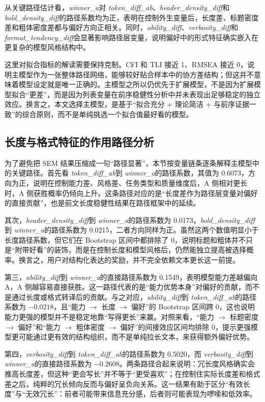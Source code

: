 \documentclass[9pt,a4paper,fontset=windows]{ctexart}
\theoremstyle{definition}
\numberwithin{equation}{section}
\newcommand{\winner}{\textit{winner\_a}}
\newcommand{\tokendiff}{\textit{token\_diff\_ab}}
\newcommand{\headerD}{\textit{header\_density\_diff}}
\newcommand{\boldD}{\textit{bold\_density\_diff}}
\newcommand{\ability}{\textit{ability\_diff}}
\newcommand{\verbosity}{\textit{verbosity\_diff}}
\newcommand{\formatt}{\textit{format\_tendency\_diff}}
\begin{document}
从关键路径估计看，\winner 对 \tokendiff、\headerD 和 \boldD 的路径系数均为正，表明在控制外生变量后，长度差、标题密度差和粗体密度差都与偏好方向正相关。同时，\ability、\verbosity 和 \formatt 会显著影响路径层变量，说明偏好中的形式特征确实嵌入在更复杂的模型风格结构中。

这里对拟合指标的解读需要保持克制。CFI 和 TLI 接近 1、RMSEA 接近 0，说明主模型作为一张整体路径网络，能够较好贴合样本中的协方差结构；但这并不意味着模型设定就是唯一正确的。主模型之所以仍优先于扩展模型，不是因为扩展模型拟合“更差”，而是因为列表变量在前序稳健性分析中并未表现出足够稳定的独立效应。换言之，本文选择主模型，是基于“拟合充分 \(+\) 理论简洁 \(+\) 与前序证据一致”的综合原则，而不是单纯挑选一个拟合值最好看的模型。

\subsection{长度与格式特征的作用路径分析}
为了避免把 SEM 结果压缩成一句“路径显著”，本节按变量链条逐条解释主模型中的关键路径。首先看 \tokendiff 到 \winner 的路径系数，其值为 0.6073，方向为正，说明在控制能力差、风格差、任务类型和质量维度后，A 侧相对更长时，A 侧获胜概率仍倾向上升。这条路径对应的是“长度差作为路径层变量对偏好的直接贡献”，也是前文长度稳健性结果在路径框架中的延续。

其次，\headerD 到 \winner 的路径系数为 0.0173，\boldD 到 \winner 的路径系数为 0.0215，二者方向同样为正。虽然这两个数值明显小于长度路径系数，但它们在 Bootstrap 区间中都排除了 0，说明标题和粗体并不只是“附带好看”的装饰，而是在控制长度和模型风格后，仍然能独立提高被选择概率。换言之，用户对结构化表达的奖励，并不完全依赖文本更长这一前提。

第三，\ability 到 \winner 的直接路径系数为 0.1549，表明模型能力差越偏向 A，A 侧越容易直接获胜。这一路径代表的是“能力优势本身”对偏好的贡献，而不是通过长度或格式转译后的贡献。与之对应，\ability 到 \tokendiff 的路径系数为 \(-0.0218\)，且“能力 \(\rightarrow\) 长度 \(\rightarrow\) 偏好”的 Bootstrap 区间跨 0，这也说明能力更强的模型并不是稳定地靠“写得更长”来赢。对照来看，“能力 \(\rightarrow\) 标题密度 \(\rightarrow\) 偏好”和“能力 \(\rightarrow\) 粗体密度 \(\rightarrow\) 偏好”的间接效应区间均排除 0，提示更强模型更可能通过更有效的结构组织，而不是单纯拉长文本，来获得额外偏好优势。

第四，\verbosity 到 \tokendiff 的路径系数为 0.5020，而 \verbosity 到 \winner 的直接路径系数为 \(-0.2608\)。两条路径合起来说明：冗长度风格确实会推高长度差，但这种“更会写长”并不等于“更受喜欢”；在控制住实际长度差和格式差之后，纯粹的冗长倾向反而与偏好呈负向关系。这一结果有助于区分“有效长度”与“无效冗长”：前者可能带来信息充分感，后者则可能表现为啰嗦和低效率。
\end{document}
